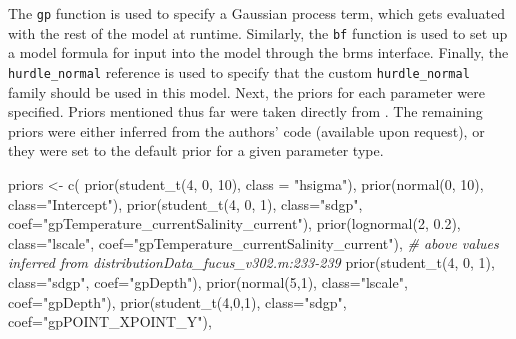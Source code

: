 \documentclass[
  12pt,
  twoside]{book}
\newenvironment{Shaded}{\begin{snugshade}}{\end{snugshade}}
\newcommand{\AttributeTok}[1]{\textcolor[rgb]{0.77,0.63,0.00}{#1}}
\newcommand{\CommentTok}[1]{\textcolor[rgb]{0.56,0.35,0.01}{\textit{#1}}}
\newcommand{\DecValTok}[1]{\textcolor[rgb]{0.00,0.00,0.81}{#1}}
\newcommand{\FloatTok}[1]{\textcolor[rgb]{0.00,0.00,0.81}{#1}}
\newcommand{\FunctionTok}[1]{\textcolor[rgb]{0.00,0.00,0.00}{#1}}
\newcommand{\NormalTok}[1]{#1}
\newcommand{\OtherTok}[1]{\textcolor[rgb]{0.56,0.35,0.01}{#1}}
\newcommand{\StringTok}[1]{\textcolor[rgb]{0.31,0.60,0.02}{#1}}
\theoremstyle{definition}
\theoremstyle{definition}
\theoremstyle{definition}
\theoremstyle{remark}
\begin{document}
The \texttt{gp} function is used to specify a Gaussian process term, which gets evaluated with the rest of the model at runtime.
Similarly, the \texttt{bf} function is used to set up a model formula for input into the model through the brms interface.
Finally, the \texttt{hurdle\_normal} reference is used to specify that the custom \texttt{hurdle\_normal} family should be used in this model.
Next, the priors for each parameter were specified.
Priors mentioned thus far were taken directly from \citet{Kotta2019}.
The remaining priors were either inferred from the authors' code (available upon request), or they were set to the default prior for a given parameter type.

\begin{Shaded}
\begin{Highlighting}[]
\NormalTok{priors }\OtherTok{\textless{}{-}} \FunctionTok{c}\NormalTok{(}
  \FunctionTok{prior}\NormalTok{(}\FunctionTok{student\_t}\NormalTok{(}\DecValTok{4}\NormalTok{, }\DecValTok{0}\NormalTok{, }\DecValTok{10}\NormalTok{), }\AttributeTok{class =} \StringTok{"hsigma"}\NormalTok{),}
  \FunctionTok{prior}\NormalTok{(}\FunctionTok{normal}\NormalTok{(}\DecValTok{0}\NormalTok{, }\DecValTok{10}\NormalTok{), }\AttributeTok{class=}\StringTok{"Intercept"}\NormalTok{),}
  \FunctionTok{prior}\NormalTok{(}\FunctionTok{student\_t}\NormalTok{(}\DecValTok{4}\NormalTok{, }\DecValTok{0}\NormalTok{, }\DecValTok{1}\NormalTok{), }\AttributeTok{class=}\StringTok{"sdgp"}\NormalTok{, }
        \AttributeTok{coef=}\StringTok{"gpTemperature\_currentSalinity\_current"}\NormalTok{),}
  \FunctionTok{prior}\NormalTok{(}\FunctionTok{lognormal}\NormalTok{(}\DecValTok{2}\NormalTok{, }\FloatTok{0.2}\NormalTok{), }\AttributeTok{class=}\StringTok{"lscale"}\NormalTok{, }
        \AttributeTok{coef=}\StringTok{"gpTemperature\_currentSalinity\_current"}\NormalTok{), }
  \CommentTok{\# above values inferred from distributionData\_fucus\_v302.m:233{-}239}
  \FunctionTok{prior}\NormalTok{(}\FunctionTok{student\_t}\NormalTok{(}\DecValTok{4}\NormalTok{, }\DecValTok{0}\NormalTok{, }\DecValTok{1}\NormalTok{), }\AttributeTok{class=}\StringTok{"sdgp"}\NormalTok{, }\AttributeTok{coef=}\StringTok{"gpDepth"}\NormalTok{),}
  \FunctionTok{prior}\NormalTok{(}\FunctionTok{normal}\NormalTok{(}\DecValTok{5}\NormalTok{,}\DecValTok{1}\NormalTok{), }\AttributeTok{class=}\StringTok{"lscale"}\NormalTok{, }\AttributeTok{coef=}\StringTok{"gpDepth"}\NormalTok{),}
  \FunctionTok{prior}\NormalTok{(}\FunctionTok{student\_t}\NormalTok{(}\DecValTok{4}\NormalTok{,}\DecValTok{0}\NormalTok{,}\DecValTok{1}\NormalTok{), }\AttributeTok{class=}\StringTok{"sdgp"}\NormalTok{, }\AttributeTok{coef=}\StringTok{"gpPOINT\_XPOINT\_Y"}\NormalTok{),}

\end{Highlighting}
\end{Shaded}
\end{document}
